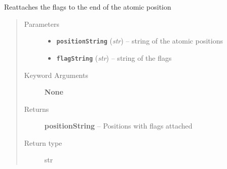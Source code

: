 \documentclass[letterpaper,10pt,english]{sphinxmanual}
\begin{document}
\begin{fulllineitems}
\label{retr:retr.attachPosFlags}
Reattaches the flags to the end of the atomic position
\begin{quote}\begin{description}
\item[{Parameters}] \leavevmode\begin{itemize}
\item {} 
\textbf{\texttt{positionString}} (\emph{str}) -- string of the atomic positions

\item {} 
\textbf{\texttt{flagString}} (\emph{str}) -- string of the flags

\end{itemize}

\item[{Keyword Arguments}] \leavevmode
\textbf{None}

\item[{Returns}] \leavevmode
\textbf{positionString} --
Positions with flags attached

\item[{Return type}] \leavevmode
str

\end{description}\end{quote}

\end{fulllineitems}

\end{document}
